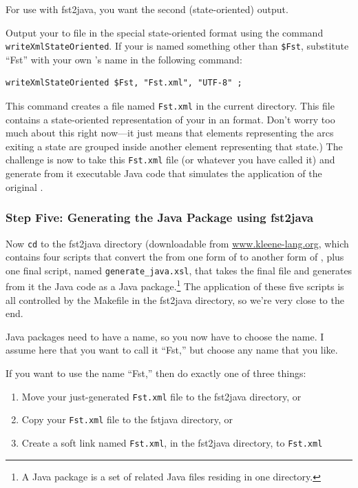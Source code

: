 \noindent
For use with fst2java, you want the second (state-oriented) output.

Output your \fsm{} to file in the special state-oriented \xml{} format
using the command \texttt{writeXmlStateOriented}.  If your \fsm{} is named
something other than \verb!$Fst!, substitute ``Fst'' with your own \fsm{}'s name in
the following command:

\begin{Verbatim}
writeXmlStateOriented $Fst, "Fst.xml", "UTF-8" ;
\end{Verbatim}

\noindent
This command creates a file named \texttt{Fst.xml} in the current directory.
This file contains a state-oriented representation of your \fsm{} in an
\xml{} format.  Don't worry too much about this right now---it just means that \xml{} elements
representing the arcs exiting a state are grouped inside another \xml{} element
representing that state.) The challenge is now to take this \texttt{Fst.xml}
file (or whatever you have called it) and generate from it executable
Java code that simulates the application of the original \fsm{}.

\subsubsection{Step Five:  Generating the Java Package using fst2java}

Now \texttt{cd} to the fst2java directory (downloadable from
\url{www.kleene-lang.org}, which contains four \xslt{} scripts that
convert the \fsm{} from one form of \xml{} to another form of \xml{}, plus one
final \xslt{} script, named \texttt{generate\_java.xsl}, that takes the final \xml{}
file and generates from it the Java code as a Java package.\footnote{A Java package is a set of related Java files residing in
one directory.}  The
application of these five \xslt{} scripts is all controlled by the Makefile
in the fst2java directory, so we're very close to the end.

Java packages need to have a name, so you now have to
choose the name.  I assume
here that you want to call it ``Fst,'' but choose any name that you like.

If you want to use the name ``Fst,'' then do exactly one of three things:

\begin{enumerate}
\item
Move your just-generated \texttt{Fst.xml} file to the fst2java directory, or
\item
Copy your \texttt{Fst.xml} file to the fstjava directory, or
\item
Create a soft link named \texttt{Fst.xml}, in the fst2java directory, to \texttt{Fst.xml}
\end{enumerate}

